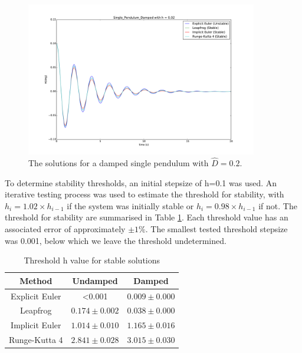 \documentclass{article}
\begin{document}
\begin{figure}
\begin{center}
\includegraphics[width=0.9\textwidth]{Single_Pendulum_Damped_Theta}
\caption{The solutions for a damped single pendulum with $\hat{D}=0.2$. }
\label{fig:singledampedtheta}
\end{center}
\end{figure}

To determine stability thresholds, an initial stepsize of h=0.1 was used. An iterative testing process was used to estimate the threshold for stability, with $h_{i} = 1.02  \times h_{i-1}$ if the system was initially stable or $h_{i} =0.98 \times h_{i-1}$ if not. The threshold for stability are summarised in Table \ref{tab:stability}. Each threshold value has an associated error of approximately $\pm1\%$. The smallest tested threshold stepsize was 0.001, below which we leave the threshold undetermined.

\begin{table}[h!]
  \centering
  \caption{Threshold h value for stable solutions}
  \label{tab:stability}
  \begin{tabular}{ccc}
    \toprule
    Method & Undamped & Damped\\
    \midrule
     Explicit Euler & \textless 0.001 & $0.009 \pm 0.000$ \\
     Leapfrog & $0.174 \pm 0.002$ & $0.038\pm 0.000$\\
     Implicit Euler & $1.014 \pm 0.010$ & $1.165 \pm 0.016$\\
     Runge-Kutta 4 & $2.841 \pm 0.028$ & $3.015 \pm 0.030$\\
    \bottomrule
  \end{tabular}
\end{table}
\end{document}
